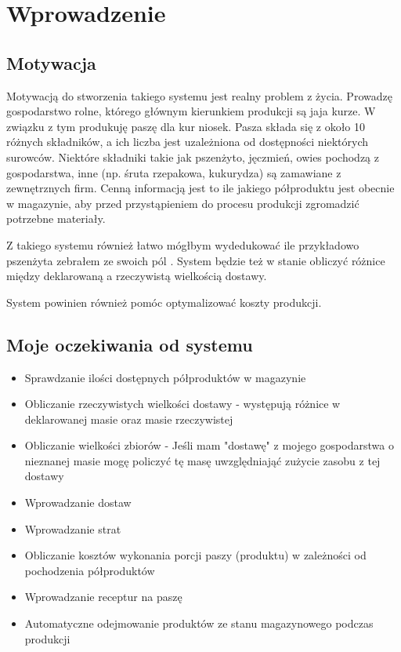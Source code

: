 \documentclass[shortabstract]{iithesis}
\author         {Jakub Kopystiański}
\begin{document}

\chapter{Wprowadzenie}

\section{Motywacja}
	Motywacją do stworzenia takiego systemu jest realny problem z życia.  Prowadzę gospodarstwo rolne, którego głównym kierunkiem produkcji są jaja kurze. W związku z tym produkuję paszę dla kur niosek. Pasza składa się z około 10 różnych składników, a ich liczba jest uzależniona od dostępności niektórych surowców. Niektóre składniki takie jak pszenżyto, jęczmień, owies pochodzą z gospodarstwa, inne (np. śruta rzepakowa, kukurydza) są zamawiane z zewnętrznych firm. Cenną informacją jest to ile jakiego półproduktu jest obecnie w magazynie, aby przed przystąpieniem do procesu produkcji zgromadzić potrzebne materiały.

	Z takiego systemu również łatwo mógłbym wydedukować ile przykładowo pszenżyta zebrałem ze swoich pól . System będzie też w stanie obliczyć różnice między deklarowaną a rzeczywistą wielkością dostawy.
	
	System powinien również pomóc optymalizować koszty produkcji. 

\section {Moje oczekiwania od systemu}

\begin{itemize}
  \item Sprawdzanie ilości dostępnych półproduktów w magazynie
  \item Obliczanie rzeczywistych wielkości dostawy - występują różnice w deklarowanej masie oraz masie rzeczywistej
  \item Obliczanie wielkości zbiorów - Jeśli mam "dostawę" z mojego gospodarstwa o nieznanej masie mogę policzyć tę masę uwzględniająć zużycie zasobu z tej dostawy 
  \item  Wprowadzanie dostaw
  \item  Wprowadzanie strat
  \item  Obliczanie kosztów wykonania porcji paszy (produktu) w zależności od pochodzenia półproduktów
  \item  Wprowadzanie receptur na paszę
  \item  Automatyczne odejmowanie produktów ze stanu magazynowego podczas produkcji
\end{itemize} 
\end{document}
